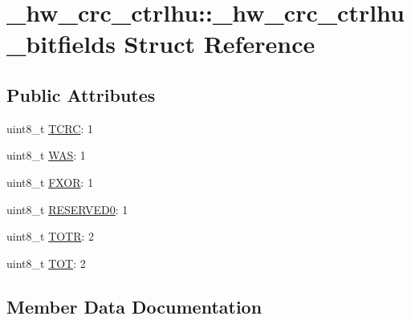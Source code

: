 \hypertarget{struct__hw__crc__ctrlhu_1_1__hw__crc__ctrlhu__bitfields}{}\section{\+\_\+hw\+\_\+crc\+\_\+ctrlhu\+:\+:\+\_\+hw\+\_\+crc\+\_\+ctrlhu\+\_\+bitfields Struct Reference}
\label{struct__hw__crc__ctrlhu_1_1__hw__crc__ctrlhu__bitfields}
\subsection*{Public Attributes}
\begin{DoxyCompactItemize}
\item 
uint8\+\_\+t \hyperlink{struct__hw__crc__ctrlhu_1_1__hw__crc__ctrlhu__bitfields_afdfb7f8a5b90121a192eba7430a7d45c}{T\+C\+RC}\+: 1
\item 
uint8\+\_\+t \hyperlink{struct__hw__crc__ctrlhu_1_1__hw__crc__ctrlhu__bitfields_ab077eef77784fc25650fb89e8e2879af}{W\+AS}\+: 1
\item 
uint8\+\_\+t \hyperlink{struct__hw__crc__ctrlhu_1_1__hw__crc__ctrlhu__bitfields_a189d2bc07b24ba51ac84a2a9d9fa96b5}{F\+X\+OR}\+: 1
\item 
uint8\+\_\+t \hyperlink{struct__hw__crc__ctrlhu_1_1__hw__crc__ctrlhu__bitfields_a490567c66b1febd35efb82100001a124}{R\+E\+S\+E\+R\+V\+E\+D0}\+: 1
\item 
uint8\+\_\+t \hyperlink{struct__hw__crc__ctrlhu_1_1__hw__crc__ctrlhu__bitfields_aca31e0c915189eee1ecb053032c2c8c4}{T\+O\+TR}\+: 2
\item 
uint8\+\_\+t \hyperlink{struct__hw__crc__ctrlhu_1_1__hw__crc__ctrlhu__bitfields_a3b2d9b73096f2c21806e2ef93632489a}{T\+OT}\+: 2
\end{DoxyCompactItemize}


\subsection{Member Data Documentation}
